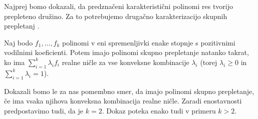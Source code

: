 Najprej bomo dokazali, da predznačeni karakteristični polinomi res tvorijo prepleteno družino. Za to potrebujemo drugačno karakterizacijo skupnih prepletanj \cite{DEDIEU1992269}.
\begin{izrek}\label{konveksne-kombinacije-prepletenih}
    Naj bodo \(f_1, \ldots, f_k\) polinomi v eni spremenljivki enake stopnje s pozitivnimi vodilnimi koeficienti. Potem imajo polinomi skupno prepletanje natanko takrat, ko ima \(\sum_{i=1}^k \lambda_i f_i\) realne ničle za vse konveksne kombinacije \(\lambda_i\) (torej \(\lambda_i\geq 0\) in \(\sum_{i=1}^k \lambda_i=1\)).
\end{izrek}
Dokazali bomo le za nas pomembno smer, da imajo polinomi skupno prepletanje, če ima vsaka njihova konveksna kombinacija realne ničle. Zaradi enostavnosti predpostavimo tudi, da je \(k=2\). Dokaz poteka enako tudi v primeru \(k>2\).

